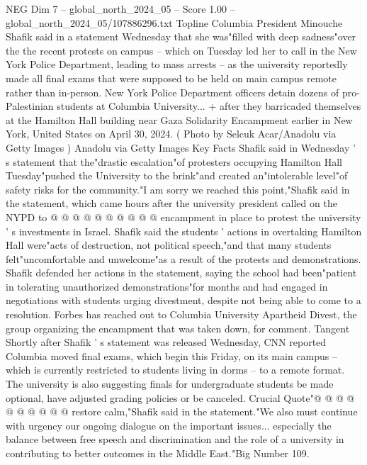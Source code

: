 \begin{textsample}{NEG Dim 7 – global\_north\_2024\_05 – Score 1.00 – global\_north\_2024\_05/107886296.txt}  \label{ex:f7_neg_399}
Topline Columbia President Minouche Shafik said in a statement Wednesday that she was"filled with deep sadness"over the the recent protests on campus -- which on Tuesday led her to call in the New York Police Department, leading to mass arrests -- as the university reportedly made all final exams that were supposed to be held on main campus remote rather than in-person.
New York Police Department officers detain dozens of pro-Palestinian students at Columbia University... + after they barricaded themselves at the Hamilton Hall building near Gaza Solidarity Encampment earlier in New York, United States on April 30, 2024. ( Photo by Selcuk Acar/Anadolu via Getty Images ) Anadolu via Getty Images Key Facts Shafik said in Wednesday ' s statement that the"drastic escalation"of protesters occupying Hamilton Hall Tuesday"pushed the University to the brink"and created an"intolerable level"of safety risks for the community."I am sorry we reached this point,"Shafik said in the statement, which came hours after the university president called on the NYPD to @ @ @ @ @ @ @ @ @ @ encampment in place to protest the university ' s investments in Israel.
Shafik said the students ' actions in overtaking Hamilton Hall were"acts of destruction, not political speech,"and that many students felt"uncomfortable and unwelcome"as a result of the protests and demonstrations.
Shafik defended her actions in the statement, saying the school had been"patient in tolerating unauthorized demonstrations"for months and had engaged in negotiations with students urging divestment, despite not being able to come to a resolution.
Forbes has reached out to Columbia University Apartheid Divest, the group organizing the encampment that was taken down, for comment.
Tangent Shortly after Shafik ' s statement was released Wednesday, CNN reported Columbia moved final exams, which begin this Friday, on its main campus -- which is currently restricted to students living in dorms -- to a remote format.
The university is also suggesting finals for undergraduate students be made optional, have adjusted grading policies or be canceled.
Crucial Quote"@ @ @ @ @ @ @ @ @ @ restore calm,"Shafik said in the statement."We also must continue with urgency our ongoing dialogue on the important issues... especially the balance between free speech and discrimination and the role of a university in contributing to better outcomes in the Middle East."Big Number 109.

\end{textsample}
